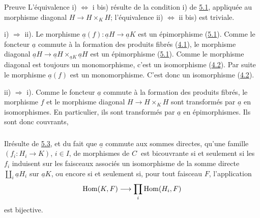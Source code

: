 \documentclass[10pt]{../fichiers-configuration-latex/smfart}
\begin{document}
\begin{enonce*}[remark]{Preuve}
L'équivalence i) $\Leftrightarrow$ i bis) résulte de la
condition i) de \hyperref[II.prop5.1]{5.1}, appliquée au morphisme diagonal
$H\rightarrow H\times_K H$; l'équivalence ii) $\Leftrightarrow$ ii
bis) est triviale.

\noindent i) $\Rightarrow$ ii). Le morphisme
$\underline{a}(f):\underline{a}H\rightarrow \underline{a}K$ est un
épimorphisme (\hyperref[II.prop5.1]{5.1}). Comme le foncteur $\underline{a}$
commute à la formation des produits fibrés (\hyperref[II.theo4.1]{4.1}), le
morphisme diagonal $\underline{a}H\rightarrow
\underline{a}H\times_{\underline{a}K}\underline{a}H$ est un épimorphisme
(\hyperref[II.prop5.1]{5.1}). Comme le morphisme diagonal est toujours un
monomorphisme, c'est un isomorphisme (\hyperref[II.prop4.2]{4.2}). Par suite
le morphisme $\underline{a}(f)$ est un monomorphisme. C'est donc un
isomorphisme (\hyperref[II.prop4.2]{4.2}).

\noindent ii) $\Rightarrow$ i). Comme le foncteur $\underline{a}$
commute à la formation des produits fibrés, le morphisme $f$ et le
morphisme diagonal $H\rightarrow H\times_K H$ sont transformés par
$\underline{a}$ en isomorphismes. En particulier, ils sont transformés
par $\underline{a}$ en épimorphismes. Ils sont donc couvrants, \cqfd
\end{enonce*}

\setcounter{subsection}{3} \setcounter{subsubsection}{0}
\subsubsection{}
Il\pageoriginale résulte de \hyperref[II.prop5.3]{5.3}, et du fait que
$\underline{a}$ commute aux sommes directes, qu'une famille
$(f_i:H_i\rightarrow K)$, $i\in I$, de morphismes de
$C^{\widehat{\phantom{,}}}$ est bicouvrante si et seulement si les
$f_i$ induisent sur les faisceaux associés un isomorphisme de la
somme directe $\amalg_i \underline{a}H_i$ sur $\underline{a}K$, ou encore si
et seulement si, pour tout faisceau $F$, l'application
$$
\operatorname{Hom}(K,F)\longrightarrow \prod_i \operatorname{Hom}(H_i,F)
$$
est bijective.
\end{document}
